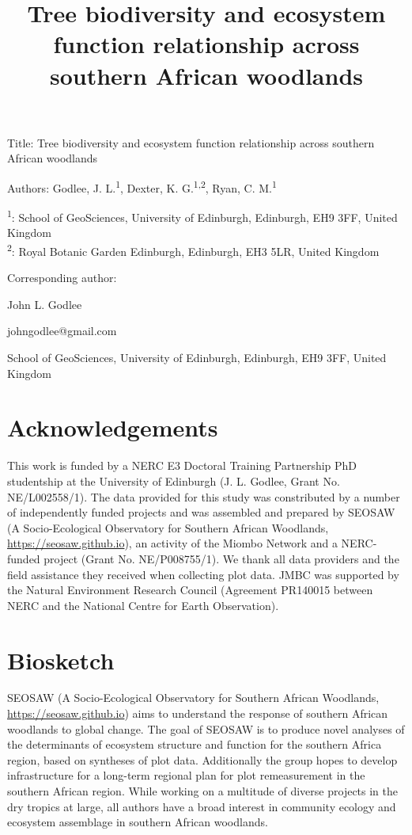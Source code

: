 \documentclass[11pt,a4paper]{article}
\title{Tree biodiversity and ecosystem function relationship across southern African woodlands}
\author{}
\date{}
\begin{document}
{\LARGE{Title: Tree biodiversity and ecosystem function relationship across southern African woodlands}}

\vspace{1cm}

Authors: Godlee, J. L.\textsuperscript{1}, Dexter, K. G.\textsuperscript{1,2}, Ryan, C. M.\textsuperscript{1}

\textsuperscript{1}: School of GeoSciences, University of Edinburgh, Edinburgh, EH9 3FF, United Kingdom \\
\textsuperscript{2}: Royal Botanic Garden Edinburgh, Edinburgh, EH3 5LR, United Kingdom

\vspace{1em}
Corresponding author:

John L. Godlee

johngodlee@gmail.com

School of GeoSciences, University of Edinburgh, Edinburgh, EH9 3FF, United Kingdom


\section{Acknowledgements}

This work is funded by a NERC E3 Doctoral Training Partnership PhD studentship at the University of Edinburgh (J. L. Godlee, Grant No. NE/L002558/1). The data provided for this study was constributed by a number of independently funded projects and was assembled and prepared by SEOSAW (A Socio-Ecological Observatory for Southern African Woodlands, \url{https://seosaw.github.io}), an activity of the Miombo Network and a NERC-funded project (Grant No. NE/P008755/1). We thank all data providers and the field assistance they received when collecting plot data. JMBC was supported by the Natural Environment Research Council (Agreement PR140015 between NERC and the National Centre for Earth Observation).

\section{Biosketch}

SEOSAW (A Socio-Ecological Observatory for Southern African Woodlands, \url{https://seosaw.github.io}) aims to understand the response of southern African woodlands to global change. The goal of SEOSAW is to produce novel analyses of the determinants of ecosystem structure and function for the southern Africa region, based on syntheses of plot data. Additionally the group hopes to develop infrastructure for a long-term regional plan for plot remeasurement in the southern African region. While working on a multitude of diverse projects in the dry tropics at large, all authors have a broad interest in community ecology and ecosystem assemblage in southern African woodlands.
\end{document}
